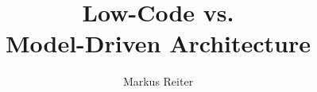 \usepackage{lmodern}
\usepackage[english]{babel}

\usepackage{fontspec}

\usepackage{multicol}

\usepackage{listings}

\usepackage{datetime}
\setdefaultdate{\usdate}

\usepackage{graphicx}
\graphicspath{{assets/}}

\newcommand{\german}[1]{{#1}}

\title{Low-Code vs.\texorpdfstring{\\}{} Model-Driven Architecture}
\author{Markus Reiter}
